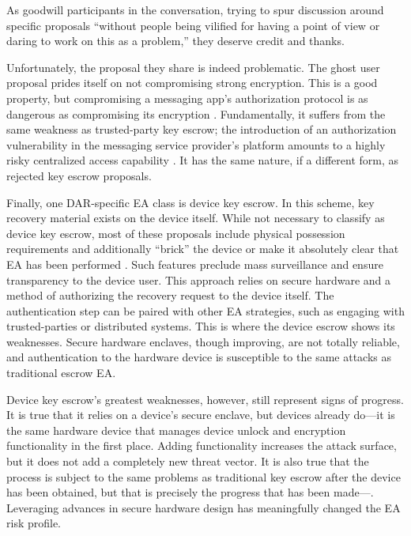 As goodwill participants in the conversation, trying to spur discussion around specific proposals ``without people being
vilified for having a point of view or daring to work on this as a problem,'' they deserve credit and thanks.

Unfortunately, the proposal they share is indeed problematic. The ghost user proposal prides itself on not compromising
strong encryption. This is a good property, but compromising a messaging app's authorization protocol is as dangerous as
compromising its encryption \cite{callas_1_2019}. Fundamentally, it suffers from the same weakness as trusted-party key
escrow; the introduction of an authorization vulnerability in the messaging service provider's platform amounts to a
highly risky centralized access capability \cite{schneier_ghost_2019}. It has the same nature, if a different form, as
rejected key escrow proposals.


Finally, one \ac{DAR}-specific \ac{EA} class is device key escrow. In this scheme, key recovery material exists on the
device itself. While not necessary to classify as device key escrow, most of these proposals include physical possession
requirements and additionally ``brick'' the device or make it absolutely clear that \ac{EA} has been performed
\cite{savage_lawful_2018} \cite{ozzie_2018}. Such features preclude mass surveillance and ensure transparency to the
device user. This approach relies on secure hardware and a method of authorizing the recovery request to the device
itself. The authentication step can be paired with other \ac{EA} strategies, such as engaging with trusted-parties or
distributed systems. This is where the device escrow shows its weaknesses. Secure hardware enclaves, though improving,
are not totally reliable, and authentication to the hardware device is susceptible to the same attacks as traditional
escrow \ac{EA}.

Device key escrow's greatest weaknesses, however, still represent signs of progress. It is true that it relies on a
device's secure enclave, but devices already do---it is the same hardware device that manages device unlock and
encryption functionality in the first place. Adding functionality increases the attack surface, but it does not add a
completely new threat vector. It is also true that the process is subject to the same problems as traditional key escrow
after the device has been obtained, but that is precisely the progress that has been made---. Leveraging advances in secure hardware design has meaningfully changed the \ac{EA} risk profile.

